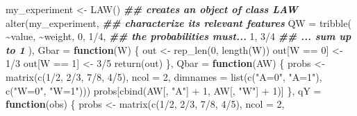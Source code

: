 \documentclass[
  11pt,
  openright,twoside]{book}
\newenvironment{Shaded}{\begin{snugshade}}{\end{snugshade}}
\newcommand{\AttributeTok}[1]{\textcolor[rgb]{0.77,0.63,0.00}{#1}}
\newcommand{\ControlFlowTok}[1]{\textcolor[rgb]{0.13,0.29,0.53}{\textbf{#1}}}
\newcommand{\DecValTok}[1]{\textcolor[rgb]{0.00,0.00,0.81}{#1}}
\newcommand{\DocumentationTok}[1]{\textcolor[rgb]{0.56,0.35,0.01}{\textbf{\textit{#1}}}}
\newcommand{\FunctionTok}[1]{\textcolor[rgb]{0.00,0.00,0.00}{#1}}
\newcommand{\NormalTok}[1]{#1}
\newcommand{\OtherTok}[1]{\textcolor[rgb]{0.56,0.35,0.01}{#1}}
\newcommand{\SpecialCharTok}[1]{\textcolor[rgb]{0.00,0.00,0.00}{#1}}
\newcommand{\StringTok}[1]{\textcolor[rgb]{0.31,0.60,0.02}{#1}}
\theoremstyle{definition}
\theoremstyle{definition}
\theoremstyle{definition}
\theoremstyle{definition}
\theoremstyle{remark}
\begin{document}
\begin{Shaded}
\begin{Highlighting}[]
\NormalTok{my\_experiment }\OtherTok{\textless{}{-}} \FunctionTok{LAW}\NormalTok{() }\DocumentationTok{\#\# creates an object of class \textquotesingle{}LAW\textquotesingle{}}
\FunctionTok{alter}\NormalTok{(my\_experiment,   }\DocumentationTok{\#\# characterize its relevant features}
      \AttributeTok{QW =} \FunctionTok{tribble}\NormalTok{(}
        \SpecialCharTok{\textasciitilde{}}\NormalTok{value, }\SpecialCharTok{\textasciitilde{}}\NormalTok{weight,}
        \DecValTok{0}\NormalTok{, }\DecValTok{1}\SpecialCharTok{/}\DecValTok{4}\NormalTok{, }\DocumentationTok{\#\# the probabilities must...}
        \DecValTok{1}\NormalTok{, }\DecValTok{3}\SpecialCharTok{/}\DecValTok{4}  \DocumentationTok{\#\# ... sum up to 1}
\NormalTok{      ),}
      \AttributeTok{Gbar =} \ControlFlowTok{function}\NormalTok{(W) \{}
\NormalTok{        out }\OtherTok{\textless{}{-}} \FunctionTok{rep\_len}\NormalTok{(}\DecValTok{0}\NormalTok{, }\FunctionTok{length}\NormalTok{(W))}
\NormalTok{        out[W }\SpecialCharTok{==} \DecValTok{0}\NormalTok{] }\OtherTok{\textless{}{-}} \DecValTok{1}\SpecialCharTok{/}\DecValTok{3}
\NormalTok{        out[W }\SpecialCharTok{==} \DecValTok{1}\NormalTok{] }\OtherTok{\textless{}{-}} \DecValTok{3}\SpecialCharTok{/}\DecValTok{5}
        \FunctionTok{return}\NormalTok{(out)}
\NormalTok{      \},}
      \AttributeTok{Qbar =} \ControlFlowTok{function}\NormalTok{(AW) \{}
\NormalTok{        probs }\OtherTok{\textless{}{-}} \FunctionTok{matrix}\NormalTok{(}\FunctionTok{c}\NormalTok{(}\DecValTok{1}\SpecialCharTok{/}\DecValTok{2}\NormalTok{, }\DecValTok{2}\SpecialCharTok{/}\DecValTok{3}\NormalTok{, }\DecValTok{7}\SpecialCharTok{/}\DecValTok{8}\NormalTok{, }\DecValTok{4}\SpecialCharTok{/}\DecValTok{5}\NormalTok{), }\AttributeTok{ncol =} \DecValTok{2}\NormalTok{,}
                        \AttributeTok{dimnames =} \FunctionTok{list}\NormalTok{(}\FunctionTok{c}\NormalTok{(}\StringTok{"A=0"}\NormalTok{, }\StringTok{"A=1"}\NormalTok{),}
                                        \FunctionTok{c}\NormalTok{(}\StringTok{"W=0"}\NormalTok{, }\StringTok{"W=1"}\NormalTok{)))}
\NormalTok{        probs[}\FunctionTok{cbind}\NormalTok{(AW[, }\StringTok{"A"}\NormalTok{] }\SpecialCharTok{+} \DecValTok{1}\NormalTok{, AW[, }\StringTok{"W"}\NormalTok{] }\SpecialCharTok{+} \DecValTok{1}\NormalTok{)]}
\NormalTok{      \},}
      \AttributeTok{qY =} \ControlFlowTok{function}\NormalTok{(obs) \{}
\NormalTok{        probs }\OtherTok{\textless{}{-}} \FunctionTok{matrix}\NormalTok{(}\FunctionTok{c}\NormalTok{(}\DecValTok{1}\SpecialCharTok{/}\DecValTok{2}\NormalTok{, }\DecValTok{2}\SpecialCharTok{/}\DecValTok{3}\NormalTok{, }\DecValTok{7}\SpecialCharTok{/}\DecValTok{8}\NormalTok{, }\DecValTok{4}\SpecialCharTok{/}\DecValTok{5}\NormalTok{), }\AttributeTok{ncol =} \DecValTok{2}\NormalTok{,}

\end{Highlighting}
\end{Shaded}
\end{document}
